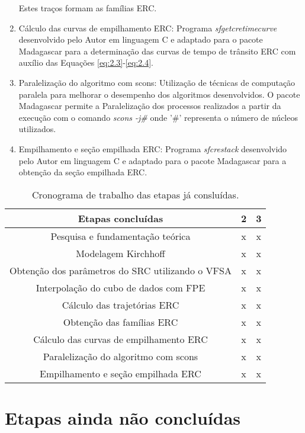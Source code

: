 \begin{enumerate}
     Estes traços formam as famílias ERC.
    \item  Cálculo das curvas de empilhamento ERC: Programa \textit{sfgetcretimecurve} desenvolvido pelo Autor 
    em linguagem C e adaptado 
    para o pacote Madagascar para a determinação das curvas de tempo de trânsito ERC com auxílio das 
    Equações \ref{eq:2.3}-\ref{eq:2.4}.
     \item Paralelização do algoritmo com scons: Utilização de técnicas de computação paralela para melhorar o desempenho
     dos algoritmos desenvolvidos. O pacote Madagascar permite a Paralelização dos processos realizados a partir da execução
     com o comando \textit{scons -j\#} onde '\#' representa o número de núcleos utilizados.
    \item  Empilhamento e seção empilhada ERC: Programa \textit{sfcrestack} desenvolvido pelo Autor em linguagem C e adaptado 
    para o pacote Madagascar para a obtenção da seção  empilhada ERC.
  \end{enumerate}

    \begin{table}[H]
      \caption{Cronograma de trabalho das etapas já consluídas.}
      \centering
      
      \begin{tabular}{|c|c|c|}

      \hline
      \textbf{Etapas concluídas} & 2 & 3 \\ \hline
      Pesquisa e fundamentação teórica & x & x \\ \hline
      Modelagem Kirchhoff & x & x \\ \hline
      Obtenção dos parâmetros do SRC utilizando o VFSA & x & x \\ \hline
      Interpolação do cubo de dados com FPE & x & x \\ \hline
      Cálculo das trajetórias ERC & x & x \\ \hline
      Obtenção das famílias ERC & x & x \\ \hline
      Cálculo das curvas de empilhamento ERC & x & x \\ \hline
      Paralelização do algoritmo com scons & x & x \\ \hline
      Empilhamento e seção empilhada ERC & x & x  \\
      \hline
      
      \end{tabular}
  \end{table}
  
\section{Etapas ainda não concluídas}

